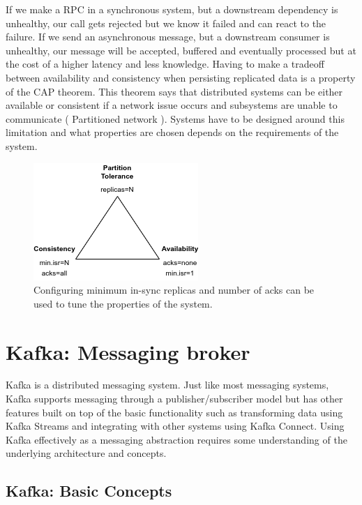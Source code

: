 \documentclass[11pt]{article}
\begin{document}
If we make a RPC in a synchronous system, but a downstream dependency is unhealthy, our call gets rejected but we know it failed and can react to the failure.
If we send an asynchronous message, but a downstream consumer is unhealthy, our message will be accepted, buffered and eventually processed but at the cost of a higher latency and less knowledge.
\newline
\newline
Having to make a tradeoff between availability and consistency when persisting replicated data is a property of the CAP theorem. This theorem says that distributed systems can be either available or consistent if a network issue occurs and subsystems are unable to communicate ( Partitioned network ). Systems have to be designed around this limitation and what properties are chosen depends on the requirements of the system.


\vspace{15pt}
\begin{figure}[htbp]
\centerline{\includegraphics[scale=1]{assets/cap.png}}
\caption{ Configuring minimum in-sync replicas and number of acks can be used to tune the properties of the system.}
\label{fig}
\end{figure}
\clearpage

\section{Kafka: Messaging broker}

Kafka is a distributed messaging system. Just like most messaging systems, Kafka supports messaging through a publisher/subscriber model but has other features built on top of the basic functionality such as transforming data using Kafka Streams\cite{kafka-stream} and integrating with other systems using Kafka Connect\cite{kafka-connect}. Using Kafka effectively as a messaging abstraction requires some understanding of the underlying architecture and concepts.

\subsection{Kafka: Basic Concepts}
\end{document}
